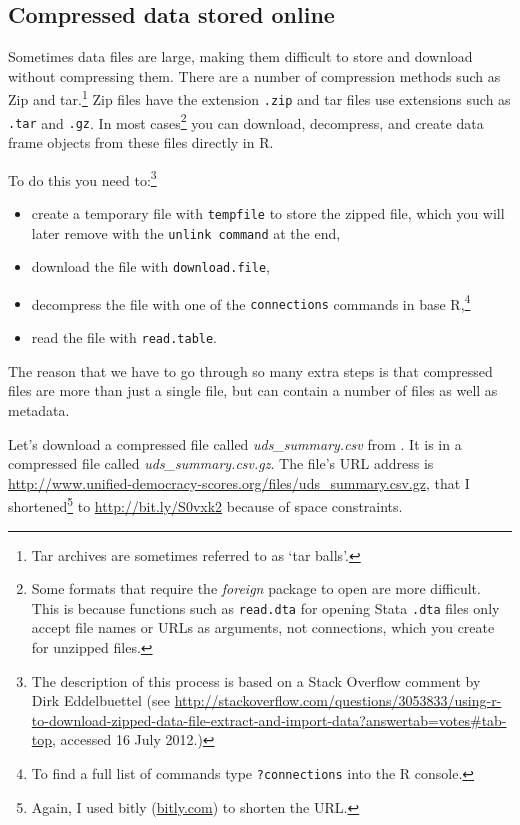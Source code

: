 \subsection{Compressed data stored online}

Sometimes data files are large, making them difficult to store and download without compressing them. There are a number of compression methods such as Zip and tar.\footnote{Tar archives are sometimes referred to as `tar balls'.} Zip files have the extension {\tt{.zip}} and tar files use extensions such as {\tt{.tar}} and {\tt{.gz}}. In most cases\footnote{Some formats that require the {\emph{foreign}} package to open are more difficult. This is because functions such as {\tt{read.dta}} for opening Stata {\tt{.dta}} files only accept file names or URLs as arguments, not connections, which you create for unzipped files.} you can download, decompress, and create data frame objects from these files directly in R. 

To do this you need to:\footnote{The description of this process is based on a Stack Overflow comment by Dirk Eddelbuettel (see {\url{http://stackoverflow.com/questions/3053833/using-r-to-download-zipped-data-file-extract-and-import-data?answertab=votes\#tab-top}}, accessed 16 July 2012.)}

\begin{itemize}
	\item create a temporary file with {\tt{tempfile}} to store the zipped file, which you will later remove with the {\tt{unlink command}} at the end,
	\item download the file with {\tt{download.file}},
	\item decompress the file with one of the {\tt{connections}} commands in base R,\footnote{To find a full list of commands type {\tt{?connections}} into the R console.}
	\item read the file with {\tt{read.table}}. 
\end{itemize}

\noindent The reason that we have to go through so many extra steps is that compressed files are more than just a single file, but can contain a number of files as well as metadata.

Let's download a compressed file called {\emph{uds\_summary.csv}} from \cite{Pemstein2010}. It is in a compressed file called {\emph{uds\_summary.csv.gz}}. The file's URL address is {\url{http://www.unified-democracy-scores.org/files/uds_summary.csv.gz}}, that I shortened\footnote{Again, I used bitly (\url{bitly.com}) to shorten the URL.} to \url{http://bit.ly/S0vxk2} because of space constraints.

